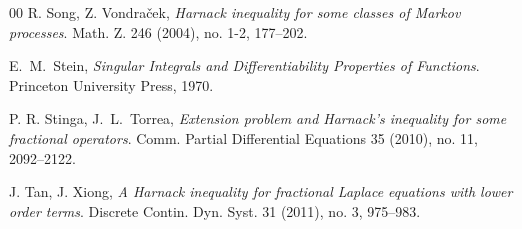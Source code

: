 \documentclass[a4paper,12pt,reqno]{amsart}
\numberwithin{equation}{section}
\theoremstyle{definition}
\theoremstyle{notation}
\begin{document}
\begin{thebibliography}{00}
R. Song, Z. Vondra\v{c}ek, \emph{Harnack inequality for some classes of Markov processes}.
Math. Z. 246 (2004), no. 1-2, 177--202.


E.~M.~Stein,
\emph{Singular Integrals and Differentiability Properties of Functions}.
Princeton University Press, 1970.


P. R. Stinga, J.~L.~Torrea, \emph{Extension problem and Harnack's inequality for some fractional operators}.
Comm. Partial Differential Equations 35 (2010), no. 11, 2092--2122.


J. Tan, J. Xiong, \emph{A Harnack inequality for fractional Laplace equations with lower order terms}. Discrete Contin. Dyn. Syst. 31 (2011), no. 3, 975--983.
	
\end{thebibliography}


\vfill
\end{document}
